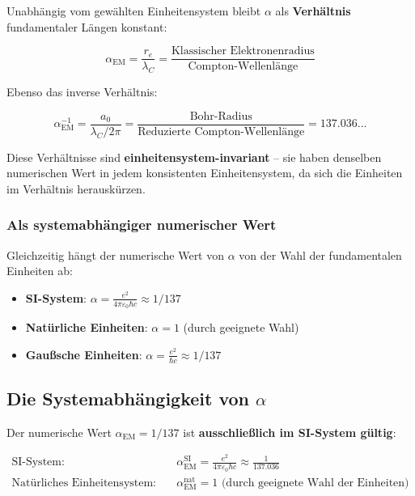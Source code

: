 \documentclass[12pt,a4paper]{article}
\begin{document}
Unabhängig vom gewählten Einheitensystem bleibt $\alpha$ als \textbf{Verhältnis} fundamentaler Längen konstant:

\begin{equation}
	\alpha_{\text{EM}} = \frac{r_e}{\lambda_C} = \frac{\text{Klassischer Elektronenradius}}{\text{Compton-Wellenlänge}}
	\label{eq:alpha_ratio_re}
\end{equation}

Ebenso das inverse Verhältnis:

\begin{equation}
	\alpha_{\text{EM}}^{-1} = \frac{a_0}{\lambda_C/2\pi} = \frac{\text{Bohr-Radius}}{\text{Reduzierte Compton-Wellenlänge}} = 137.036...
	\label{eq:alpha_ratio_bohr}
\end{equation}

Diese Verhältnisse sind \textbf{einheitensystem-invariant} -- sie haben denselben numerischen Wert in jedem konsistenten Einheitensystem, da sich die Einheiten im Verhältnis herauskürzen.

\subsubsection{Als systemabhängiger numerischer Wert}
\label{subsubsec:system_dependent}

Gleichzeitig hängt der numerische Wert von $\alpha$ von der Wahl der fundamentalen Einheiten ab:

\begin{itemize}
	\item \textbf{SI-System}: $\alpha = \frac{e^2}{4\pi\varepsilon_0\hbar c} \approx 1/137$
	\item \textbf{Natürliche Einheiten}: $\alpha = 1$ (durch geeignete Wahl)
	\item \textbf{Gaußsche Einheiten}: $\alpha = \frac{e^2}{\hbar c} \approx 1/137$
\end{itemize}

\subsection{Die Systemabhängigkeit von $\alpha$}
\label{subsec:alpha_system_dependency}

Der numerische Wert $\alpha_{\text{EM}} = 1/137$ ist \textbf{ausschließlich im SI-System gültig}:

\begin{align}
	\text{SI-System:} \quad &\alpha_{\text{EM}}^{\text{SI}} = \frac{e^2}{4\pi\varepsilon_0\hbar c} \approx \frac{1}{137.036} \\
	\text{Natürliches Einheitensystem:} \quad &\alpha_{\text{EM}}^{\text{nat}} = 1 \text{ (durch geeignete Wahl der Einheiten)}
\end{align}
\end{document}
